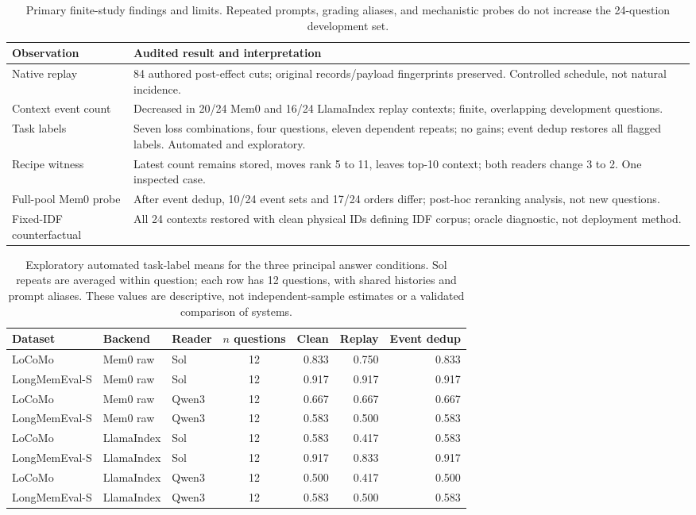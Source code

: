 \documentclass[10pt,letterpaper]{article}
\begin{document}
\begin{table}[t]
\centering
\small
\begin{tabularx}{\linewidth}{@{}l X@{}}
\toprule
Observation & Audited result and interpretation \\
\midrule
Native replay & 84 authored post-effect cuts; original records/payload fingerprints preserved. Controlled schedule, not natural incidence. \\
Context event count & Decreased in 20/24 Mem0 and 16/24 LlamaIndex replay contexts; finite, overlapping development questions. \\
Task labels & Seven loss combinations, four questions, eleven dependent repeats; no gains; event dedup restores all flagged labels. Automated and exploratory. \\
Recipe witness & Latest count remains stored, moves rank 5 to 11, leaves top-10 context; both readers change 3 to 2. One inspected case. \\
Full-pool Mem0 probe & After event dedup, 10/24 event sets and 17/24 orders differ; post-hoc reranking analysis, not new questions. \\
Fixed-IDF counterfactual & All 24 contexts restored with clean physical IDs defining IDF corpus; oracle diagnostic, not deployment method. \\
\bottomrule
\end{tabularx}
\caption{Primary finite-study findings and limits. Repeated prompts, grading aliases, and mechanistic probes do not increase the 24-question development set.}
\label{tab:results}
\end{table}

\begin{table}[t]
\centering
\small
\begin{tabular}{@{}lllc rr r@{}}
\toprule
Dataset & Backend & Reader & $n$ questions & Clean & Replay & Event dedup \\
\midrule
LoCoMo & Mem0 raw & Sol & 12 & 0.833 & 0.750 & 0.833 \\
LongMemEval-S & Mem0 raw & Sol & 12 & 0.917 & 0.917 & 0.917 \\
LoCoMo & Mem0 raw & Qwen3 & 12 & 0.667 & 0.667 & 0.667 \\
LongMemEval-S & Mem0 raw & Qwen3 & 12 & 0.583 & 0.500 & 0.583 \\
LoCoMo & LlamaIndex & Sol & 12 & 0.583 & 0.417 & 0.583 \\
LongMemEval-S & LlamaIndex & Sol & 12 & 0.917 & 0.833 & 0.917 \\
LoCoMo & LlamaIndex & Qwen3 & 12 & 0.500 & 0.417 & 0.500 \\
LongMemEval-S & LlamaIndex & Qwen3 & 12 & 0.583 & 0.500 & 0.583 \\
\bottomrule
\end{tabular}
\caption{Exploratory automated task-label means for the three principal answer conditions. Sol repeats are averaged within question; each row has 12 questions, with shared histories and prompt aliases. These values are descriptive, not independent-sample estimates or a validated comparison of systems.}
\label{tab:taskmeans}
\end{table}
\end{document}
